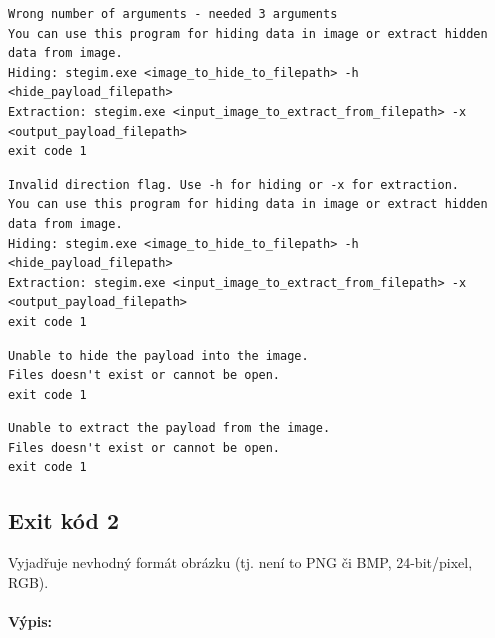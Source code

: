 \documentclass[12pt]{report}
\begin{document}
    \begin{mdframed}
        \begin{verbatim}
Wrong number of arguments - needed 3 arguments
You can use this program for hiding data in image or extract hidden data from image.
Hiding: stegim.exe <image_to_hide_to_filepath> -h <hide_payload_filepath>
Extraction: stegim.exe <input_image_to_extract_from_filepath> -x <output_payload_filepath>
exit code 1
        \end{verbatim}
    \end{mdframed}

    \begin{mdframed}
        \begin{verbatim}
Invalid direction flag. Use -h for hiding or -x for extraction.
You can use this program for hiding data in image or extract hidden data from image.
Hiding: stegim.exe <image_to_hide_to_filepath> -h <hide_payload_filepath>
Extraction: stegim.exe <input_image_to_extract_from_filepath> -x <output_payload_filepath>
exit code 1
        \end{verbatim}
    \end{mdframed}

    \begin{mdframed}
        \begin{verbatim}
Unable to hide the payload into the image.
Files doesn't exist or cannot be open.
exit code 1
        \end{verbatim}
    \end{mdframed}

    \begin{mdframed}
        \begin{verbatim}
Unable to extract the payload from the image.
Files doesn't exist or cannot be open.
exit code 1
        \end{verbatim}
    \end{mdframed}

    \subsection{Exit kód 2}
    Vyjadřuje nevhodný formát obrázku (tj. není to PNG či BMP, 24-bit/pixel,
    RGB).\\

    \paragraph{Výpis:}
\end{document}
